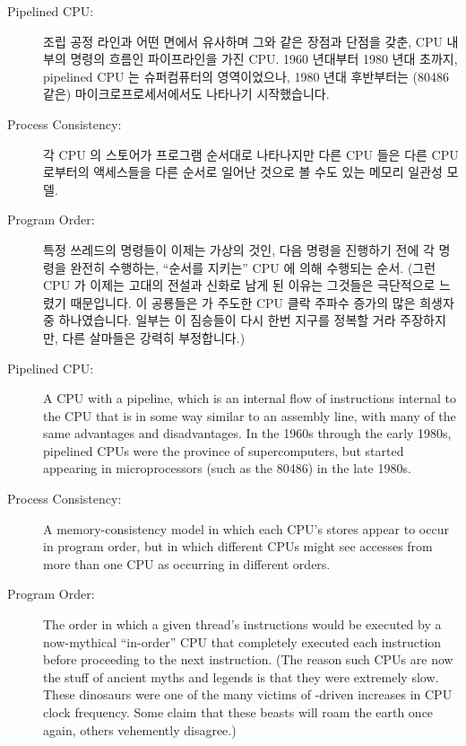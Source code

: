 \begin{description}
\fi

\item[Pipelined CPU:]
	조립 공정 라인과 어떤 면에서 유사하며 그와 같은 장점과 단점을 갖춘, CPU
	내부의 명령의 흐름인 파이프라인을 가진 CPU.
	1960 년대부터 1980 년대 초까지, pipelined CPU 는 슈퍼컴퓨터의
	영역이었으나, 1980 년대 후반부터는 (80486 같은) 마이크로프로세서에서도
	나타나기 시작했습니다.
\item[Process Consistency:]
	각 CPU 의 스토어가 프로그램 순서대로 나타나지만 다른 CPU 들은 다른 CPU
	로부터의 액세스들을 다른 순서로 일어난 것으로 볼 수도 있는 메모리
	일관성 모델.
\item[Program Order:]
	특정 쓰레드의 명령들이 이제는 가상의 것인, 다음 명령을 진행하기 전에 각
	명령을 완전히 수행하는, ``순서를 지키는'' CPU 에 의해 수행되는 순서.
	(그런 CPU 가 이제는 고대의 전설과 신화로 남게 된 이유는 그것들은
	극단적으로 느렸기 때문입니다.
	이 공룡들은 
	 가 주도한 CPU 클락 주파수 증가의 많은
	희생자 중 하나였습니다.
	일부는 이 짐승들이 다시 한번 지구를 정복할 거라 주장하지만, 다른
	살마들은 강력히 부정합니다.)

\iffalse

\item[Pipelined CPU:]
	A CPU with a pipeline, which is
	an internal flow of instructions internal to the CPU that
	is in some way similar to an assembly line, with many of
	the same advantages and disadvantages.
	In the 1960s through the early 1980s, pipelined CPUs were the
	province of supercomputers, but started appearing in microprocessors
	(such as the 80486) in the late 1980s.
\item[Process Consistency:]
	A memory-consistency model in which each CPU's stores appear to
	occur in program order, but in which different CPUs might see
	accesses from more than one CPU as occurring in different orders.
\item[Program Order:]
	The order in which a given thread's instructions
	would be executed by a now-mythical ``in-order'' CPU that
	completely executed each instruction before proceeding to
	the next instruction.
	(The reason such CPUs are now the stuff of ancient myths
	and legends is that they were extremely slow.
	These dinosaurs were one of the many victims of
	-driven increases in CPU clock frequency.
	Some claim that these beasts will roam the earth once again,
	others vehemently disagree.)


\end{description}
